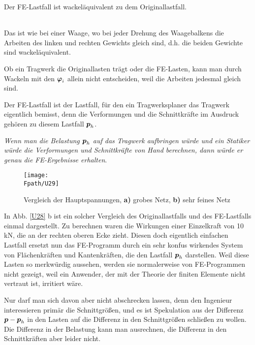 \hspace*{-12pt}\colorbox{highlightBlue}{\parbox{0.98\textwidth}{Der FE-Lastfall ist \glq wackel\"{a}quivalent\grq{} zu dem Originallastfall.
}}\\

Das ist wie bei einer Waage, wo bei jeder Drehung des Waagebalkens die Arbeiten des linken und rechten Gewichts gleich sind, d.h. die beiden Gewichte sind \glq wackel\"{a}quivalent\grq{}.

Ob ein Tragwerk die Originallasten tr\"{a}gt oder die FE-Lasten, kann man durch Wackeln mit den $\mbox{\boldmath $\varphi$}_i$ allein nicht entscheiden, weil die Arbeiten jedesmal gleich sind.

Der FE-Lastfall ist der Lastfall, f\"{u}r den ein Tragwerksplaner das Tragwerk eigentlich bemisst, denn die Verformungen und die Schnittkr\"{a}fte im Ausdruck geh\"{o}ren zu diesem Lastfall $\mbox{\boldmath $p$}_h$.

{\em Wenn man die Belastung $\mbox{\boldmath $p$}_h$ auf das Tragwerk aufbringen w\"{u}rde und ein Statiker w\"{u}rde die Verformungen und Schnittkr\"{a}fte von Hand berechnen, dann w\"{u}rde er genau die FE-Ergebnisse erhalten\/}.

\begin{figure}[tbp]
\centering
\if {} \sidecaption \fi
\texttt{[image: \\Fpath/U29]}
\caption{Vergleich der Hauptspannungen, {\bf a)} grobes Netz, {\bf b)} sehr feines Netz} \label{U29}
\end{figure}%

In Abb. \ref{U28} b ist ein solcher Vergleich des Originallastfalls und des FE-Lastfalls einmal dargestellt. Zu berechnen waren die Wirkungen einer Einzelkraft von 10 kN, die an der rechten oberen Ecke zieht. Diesen doch eigentlich einfachen Lastfall ersetzt nun das FE-Programm durch ein sehr konfus wirkendes System von Fl\"{a}chenkr\"{a}ften und Kantenkr\"{a}ften, die den Lastfall $\mbox{\boldmath $p$}_h$ darstellen. Weil diese Lasten so \glq merkw\"{u}rdig\grq{} aussehen, werden sie normalerweise von FE-Programmen nicht gezeigt, weil ein Anwender, der mit der Theorie der finiten Elemente nicht vertraut ist, irritiert w\"{a}re.

Nur darf man sich davon aber nicht abschrecken lassen, denn den Ingenieur interessieren prim\"{a}r die Schnittgr\"{o}{\ss}en, und es ist Spekulation aus der Differenz $\mbox{\boldmath $p$} - \mbox{\boldmath $p$}_h$ in den Lasten auf die Differenz in den Schnittgr\"{o}{\ss}en schlie{\ss}en zu wollen. Die Differenz in der Belastung kann man ausrechnen, die Differenz in den Schnittkr\"{a}ften aber leider nicht.

